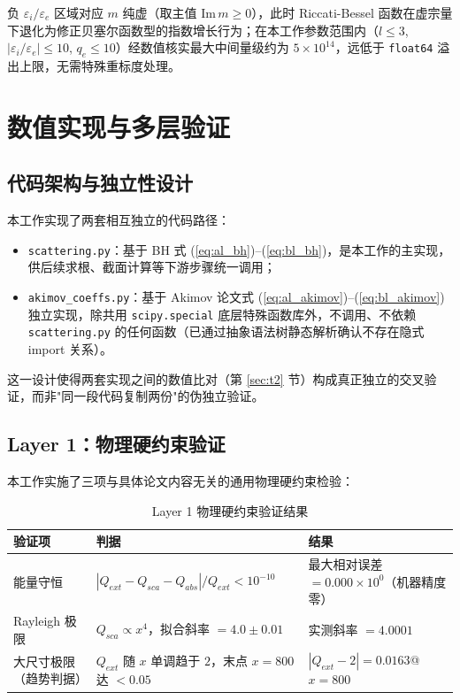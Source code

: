 \documentclass[12pt]{ctexart}
\begin{document}
负 $\varepsilon_i/\varepsilon_e$ 区域对应 $m$ 纯虚（取主值 $\mathrm{Im}\,m\ge 0$），此时 Riccati-Bessel 函数在虚宗量下退化为修正贝塞尔函数型的指数增长行为；在本工作参数范围内（$l\le 3$, $|\varepsilon_i/\varepsilon_e|\le 10$, $q_e\le 10$）经数值核实最大中间量级约为 $5\times10^{14}$，远低于 \texttt{float64} 溢出上限，无需特殊重标度处理。

\section{数值实现与多层验证}

\subsection{代码架构与独立性设计}

本工作实现了两套相互独立的代码路径：

\begin{itemize}
  \item \texttt{scattering.py}：基于 BH 式 (\ref{eq:al_bh})--(\ref{eq:bl_bh})，是本工作的主实现，供后续求根、截面计算等下游步骤统一调用；
  \item \texttt{akimov\_coeffs.py}：基于 Akimov 论文式 (\ref{eq:al_akimov})--(\ref{eq:bl_akimov}) 独立实现，除共用 \texttt{scipy.special} 底层特殊函数库外，不调用、不依赖 \texttt{scattering.py} 的任何函数（已通过抽象语法树静态解析确认不存在隐式 import 关系）。
\end{itemize}

这一设计使得两套实现之间的数值比对（第 \ref{sec:t2} 节）构成真正独立的交叉验证，而非"同一段代码复制两份"的伪独立验证。

\subsection{Layer 1：物理硬约束验证}

本工作实施了三项与具体论文内容无关的通用物理硬约束检验：

\begin{table}[H]
\centering
\caption{Layer 1 物理硬约束验证结果}
\label{tab:layer1}
\begin{tabularx}{\textwidth}{@{}p{2.6cm}Xp{3.6cm}@{}}
\toprule
验证项 & 判据 & 结果 \\
\midrule
能量守恒 & $|Q_{ext}-Q_{sca}-Q_{abs}|/Q_{ext} < 10^{-10}$ & 最大相对误差 $=0.000\times10^{0}$（机器精度零）\\
Rayleigh 极限 & $Q_{sca}\propto x^4$，拟合斜率 $=4.0\pm0.01$ & 实测斜率 $=4.0001$ \\
大尺寸极限\newline（趋势判据） & $Q_{ext}$ 随 $x$ 单调趋于 $2$，末点 $x=800$ 达 $<0.05$ & $|Q_{ext}-2|=0.0163$\newline @ $x=800$ \\
\bottomrule
\end{tabularx}
\end{table}
\end{document}
